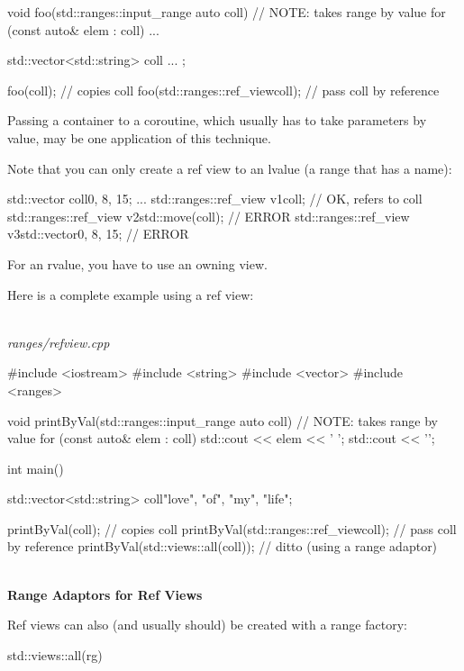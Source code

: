 \begin{cpp}
void foo(std::ranges::input_range auto coll) // NOTE: takes range by value
{
	for (const auto& elem : coll) {
		...
	}
}

std::vector<std::string> coll{ ... };

foo(coll); // copies coll
foo(std::ranges::ref_view{coll}); // pass coll by reference
\end{cpp}

Passing a container to a coroutine, which usually has to take parameters by value, may be one application of this technique.

Note that you can only create a ref view to an lvalue (a range that has a name):

\begin{cpp}
std::vector coll{0, 8, 15};
...
std::ranges::ref_view v1{coll}; // OK, refers to coll
std::ranges::ref_view v2{std::move(coll)}; // ERROR
std::ranges::ref_view v3{std::vector{0, 8, 15}}; // ERROR
\end{cpp}

For an rvalue, you have to use an owning view.

Here is a complete example using a ref view:

\noindent
\hspace*{\fill} \\ %
\textit{ranges/refview.cpp}

\begin{cpp}
#include <iostream>
#include <string>
#include <vector>
#include <ranges>

void printByVal(std::ranges::input_range auto coll) // NOTE: takes range by value
{
	for (const auto& elem : coll) {
		std::cout << elem << ' ';
	}
	std::cout << '\n';
}

int main()
{
	std::vector<std::string> coll{"love", "of", "my", "life"};
	
	printByVal(coll); // copies coll
	printByVal(std::ranges::ref_view{coll}); // pass coll by reference
	printByVal(std::views::all(coll)); // ditto (using a range adaptor)
}
\end{cpp}

\noindent
\hspace*{\fill} \\ %
\textbf{Range Adaptors for Ref Views}

Ref views can also (and usually should) be created with a range factory:

\begin{cpp}
std::views::all(rg)
\end{cpp}

